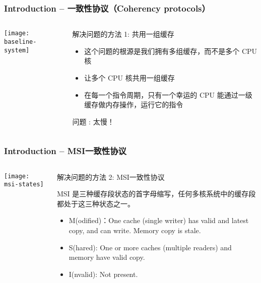 \begin{frame}[plain]	
	\frametitle{Introduction -- 一致性协议（Coherency protocols） }
	
	
	\begin{columns}
		
		\begin{column}{.4\textwidth}
			\texttt{[image: baseline-system]}
		\end{column}
		\begin{column}{.6\textwidth}
			解决问题的方法 1: 共用一组缓存
			\begin{itemize}
				\item 这个问题的根源是我们拥有多组缓存，而不是多个 CPU 核
				\item 让多个 CPU 核共用一组缓存
				\item 在每一个指令周期，只有一个幸运的 CPU 能通过一级缓存做内存操作，运行它的指令
			\end{itemize}
			问题 
			\pause
			: 太慢！
		\end{column}
	\end{columns}
	
\end{frame}


\begin{frame}[plain]	
	\frametitle{Introduction -- MSI一致性协议}
	
	
	\begin{columns}
		
		\begin{column}{.4\textwidth}
			\texttt{[image: msi-states]}
		\end{column}
		\begin{column}{.6\textwidth}
			解决问题的方法 2: MSI一致性协议
			
			MSI 是三种缓存段状态的首字母缩写，任何多核系统中的缓存段都处于这三种状态之一。
			\begin{itemize}
				\item M(odified)：One cache (single writer) has valid and latest copy, and can write. Memory copy is stale.
				\item S(hared): One or more caches (multiple readers) and memory have valid copy.
				\item I(nvalid): Not present.
			\end{itemize}
			
		\end{column}
	\end{columns}
	
\end{frame}



